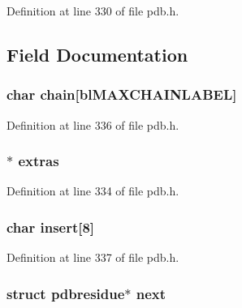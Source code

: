Definition at line 330 of file pdb.\-h.



\subsection{Field Documentation}
\hypertarget{structpdbresidue_abe96afafc1017db40e25d4183a058bc5}{
\subsubsection[{chain}]{\setlength{\rightskip}{0pt plus 5cm}char chain\mbox{[}{\bf bl\-M\-A\-X\-C\-H\-A\-I\-N\-L\-A\-B\-E\-L}\mbox{]}}}\label{structpdbresidue_abe96afafc1017db40e25d4183a058bc5}


Definition at line 336 of file pdb.\-h.

\hypertarget{structpdbresidue_aaa357dbbf4b88fcb1df71547b2d085a6}{
\subsubsection[{extras}]{$\ast$ extras}}\label{structpdbresidue_aaa357dbbf4b88fcb1df71547b2d085a6}


Definition at line 334 of file pdb.\-h.

\hypertarget{structpdbresidue_a8cc72faf0908e6fff29637c614e608ed}{
\subsubsection[{insert}]{\setlength{\rightskip}{0pt plus 5cm}char insert\mbox{[}8\mbox{]}}}\label{structpdbresidue_a8cc72faf0908e6fff29637c614e608ed}


Definition at line 337 of file pdb.\-h.

\hypertarget{structpdbresidue_a7293abcb107cb64e11e54348b5e31fbd}{
\subsubsection[{next}]{\setlength{\rightskip}{0pt plus 5cm}struct {\bf pdbresidue}$\ast$ next}}\label{structpdbresidue_a7293abcb107cb64e11e54348b5e31fbd}


